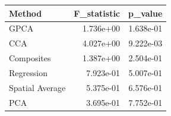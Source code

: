 \begin{tabular}{lrr}
\toprule
Method & F_statistic & p_value \\
\midrule
GPCA & 1.736e+00 & 1.638e-01 \\
CCA & 4.027e+00 & 9.222e-03 \\
Composites & 1.387e+00 & 2.504e-01 \\
Regression & 7.923e-01 & 5.007e-01 \\
Spatial Average & 5.375e-01 & 6.576e-01 \\
PCA & 3.695e-01 & 7.752e-01 \\
\bottomrule
\end{tabular}
